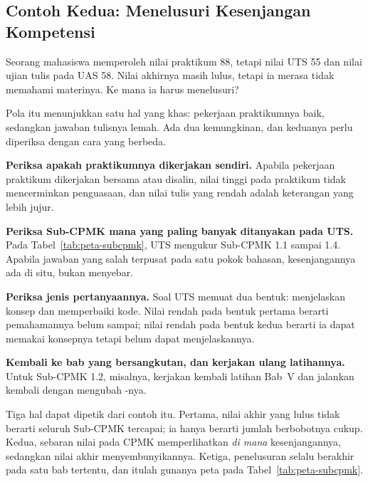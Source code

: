 \subsection{Contoh Kedua: Menelusuri Kesenjangan Kompetensi}

\begin{contohbox}
Seorang mahasiswa memperoleh nilai praktikum 88, tetapi nilai UTS 55 dan nilai
ujian tulis pada UAS 58. Nilai akhirnya masih lulus, tetapi ia merasa tidak
memahami materinya. Ke mana ia harus menelusuri?
\end{contohbox}

Pola itu menunjukkan satu hal yang khas: pekerjaan praktikumnya baik,
sedangkan jawaban tulisnya lemah. Ada dua kemungkinan, dan keduanya perlu
diperiksa dengan cara yang berbeda.

\begin{langkah}
  \item \textbf{Periksa apakah praktikumnya dikerjakan sendiri.} Apabila
        pekerjaan praktikum dikerjakan bersama atau disalin, nilai tinggi pada
        praktikum tidak mencerminkan penguasaan, dan nilai tulis yang rendah
        adalah keterangan yang lebih jujur.
  \item \textbf{Periksa Sub-CPMK mana yang paling banyak ditanyakan pada
        UTS.} Pada Tabel~\ref{tab:peta-subcpmk}, UTS mengukur Sub-CPMK 1.1
        sampai 1.4. Apabila jawaban yang salah terpusat pada satu pokok
        bahasan, kesenjangannya ada di situ, bukan menyebar.
  \item \textbf{Periksa jenis pertanyaannya.} Soal UTS memuat dua bentuk:
        menjelaskan konsep dan memperbaiki kode. Nilai rendah pada bentuk
        pertama berarti pemahamannya belum sampai; nilai rendah pada bentuk
        kedua berarti ia dapat memakai konsepnya tetapi belum dapat
        menjelaskannya.
  \item \textbf{Kembali ke bab yang bersangkutan, dan kerjakan ulang
        latihannya.} Untuk Sub-CPMK 1.2, misalnya, kerjakan kembali latihan
        Bab~V dan jalankan kembali  dengan mengubah
        -nya.
\end{langkah}

Tiga hal dapat dipetik dari contoh itu. Pertama, nilai akhir yang lulus tidak
berarti seluruh Sub-CPMK tercapai; ia hanya berarti jumlah berbobotnya cukup.
Kedua, sebaran nilai pada CPMK memperlihatkan \emph{di mana} kesenjangannya,
sedangkan nilai akhir menyembunyikannya. Ketiga, penelusuran selalu berakhir
pada satu bab tertentu, dan itulah gunanya peta pada
Tabel~\ref{tab:peta-subcpmk}.
